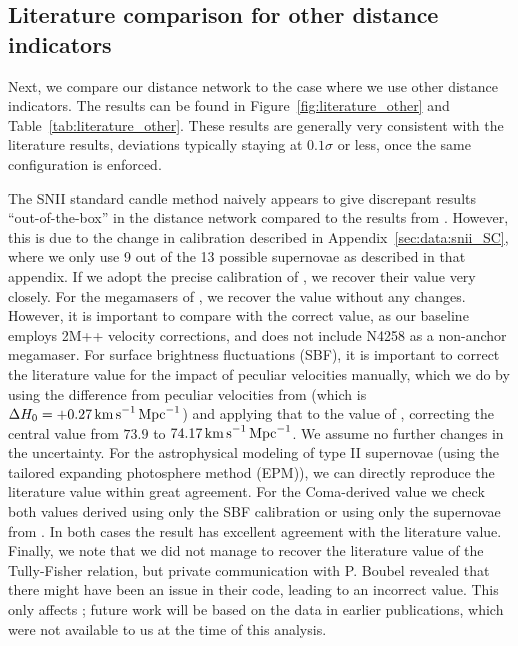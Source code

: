 \subsection{Literature comparison for other distance indicators}

Next, we compare our distance network to the case where we use other distance indicators. The results can be found in Figure~\ref{fig:literature_other} and Table~\ref{tab:literature_other}. These results are generally very consistent with the literature results, deviations typically staying at $0.1\sigma$ or less, once the same configuration is enforced. 

The SNII standard candle method naively appears to give discrepant results ``out-of-the-box'' in the distance network compared to the results from \citet{2022MNRAS.514.4620D}. However, this is due to the change in calibration described in Appendix~\ref{sec:data:snii_SC}, where we only use 9 out of the 13 possible supernovae as described in that appendix. If we adopt the precise calibration of \citet{2022MNRAS.514.4620D}, we recover their value very closely. For the megamasers of \citet{2020ApJ...891L...1P}, we recover the value without any changes. However, it is important to compare with the correct value, as our baseline employs 2M++ velocity corrections, and does not include N4258 as a non-anchor megamaser. For surface brightness fluctuations (SBF), it is important to correct the literature value for the impact of peculiar velocities manually, which we do by using the difference from peculiar velocities from \citet{2021ApJ...911...65B} (which is $\Delta H_0 = + 0.27 \,{\rm km\,s}^{-1}{\rm\,Mpc}^{-1}$) and applying that to the value of \citet{2025MNRAS.539.3627S}, correcting the central value from $73.9$ to $74.17\,{\rm km\,s}^{-1}{\rm\,Mpc}^{-1}$. We assume no further changes in the uncertainty. For the astrophysical modeling of type II supernovae (using the tailored expanding photosphere method (EPM)), we can directly reproduce the literature value within great agreement. For the Coma-derived value we check both values derived using only the SBF calibration or using only the supernovae from \citet{2022ApJ...934L...7R}. In both cases the result has excellent agreement with the literature value. Finally, we note that we did not manage to recover the literature value of the Tully-Fisher relation, but private communication with P. Boubel revealed that there might have been an issue in their code, leading to an incorrect value.  This only affects \cite{2024MNRAS.531...84B}; future work will be based on the data in earlier publications, which were not available to us at the time of this analysis.

